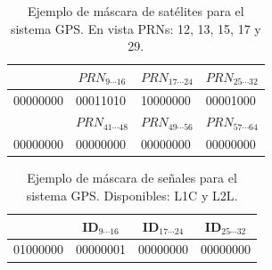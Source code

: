 \documentclass[a4paper,12pt,oneside,onecolumn,final,openright]{book}%
\begin{document}
\begin{table}[]
\centering
\begin{tabular}{|l|l|l|l|}
\hline
\rowcolor[HTML]{9B9B9B} 
\multicolumn{1}{|c|}{\cellcolor[HTML]{9B9B9B}$PRN_{1\cdots 8}$}    & \multicolumn{1}{c|}{\cellcolor[HTML]{9B9B9B}$PRN_{9\cdots 16}$}    & \multicolumn{1}{c|}{\cellcolor[HTML]{9B9B9B}$PRN_{17\cdots 24}$} & \multicolumn{1}{c|}{\cellcolor[HTML]{9B9B9B}$PRN_{25\cdots 32}$} \\ \hline
00000000                                                 & 00011010                                                & 10000000                                                & 00001000                                                \\ \hline
\rowcolor[HTML]{9B9B9B} 
\multicolumn{1}{|c|}{\cellcolor[HTML]{9B9B9B}$PRN_{33\cdots 40}$} & \multicolumn{1}{c|}{\cellcolor[HTML]{9B9B9B}$PRN_{41\cdots 48}$} & \multicolumn{1}{c|}{\cellcolor[HTML]{9B9B9B}$PRN_{49\cdots 56}$} & \multicolumn{1}{c|}{\cellcolor[HTML]{9B9B9B}$PRN_{57\cdots 64}$} \\ \hline
00000000                                                 & 00000000                                                & 00000000                                                & 00000000                                                \\ \hline
\end{tabular}
\caption{Ejemplo de máscara de satélites para el sistema GPS. En vista PRNs: 12, 13, 15, 17 y 29.}
\label{tab:sat_mask}
\end{table}


\begin{table}[]
\centering
\begin{tabular}{|l|l|l|l|}
\hline
\rowcolor[HTML]{9B9B9B} 
\multicolumn{1}{|c|}{\cellcolor[HTML]{9B9B9B}ID$_{1\cdots 8}$}    & \multicolumn{1}{c|}{\cellcolor[HTML]{9B9B9B}ID$_{9\cdots 16}$}    & \multicolumn{1}{c|}{\cellcolor[HTML]{9B9B9B}ID$_{17\cdots 24}$} & \multicolumn{1}{c|}{\cellcolor[HTML]{9B9B9B}ID$_{25\cdots 32}$} \\ \hline
01000000                                                 & 00000001                                                & 00000000                                                & 00000000                                                \\ \hline
\end{tabular}
\caption{Ejemplo de máscara de señales para el sistema GPS. Disponibles: L1C y L2L.}
\label{tab:sig_mask}
\end{table}
\end{document}
